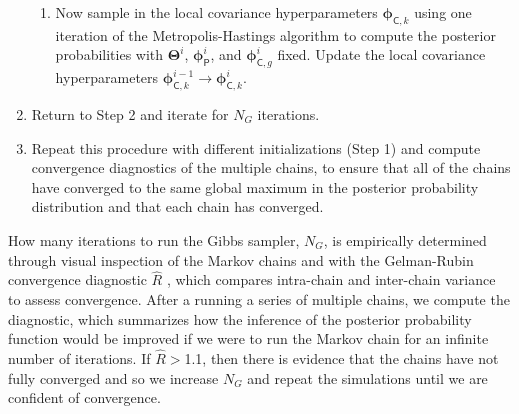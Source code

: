 \documentclass[iop,floatfix]{emulateapj}
\newcommand{\vT}{ {\bm \Theta}}
\newcommand{\vp}{ {\bm \phi}}
\newcommand{\cheb}{ \vp_{\mathsf{P}}}
\begin{document}
\begin{enumerate}
\begin{enumerate}
\item Now sample in the local covariance hyperparameters $\vp_{{\mathsf C},k}$ using one 
iteration of the Metropolis-Hastings algorithm to compute the posterior probabilities
with $\vT^i$, $\cheb^i$, and $\vp_{{\mathsf C}, g}^i$ fixed.  Update the local covariance 
hyperparameters $\vp_{{\mathsf C}, k}^{i-1} \rightarrow \vp_{{\mathsf C}, k}^i$.  
\end{enumerate}

\item Return to Step 2 and iterate for $N_G$ iterations.

\item Repeat this procedure with different initializations (Step 1) and compute convergence diagnostics of the multiple chains, to ensure that all of the chains have converged to the same global 
maximum in the posterior probability distribution and that each chain has converged.
\end{enumerate}
How many iterations to run the Gibbs sampler, $N_G$, is empirically determined through visual inspection of the Markov chains and with the Gelman-Rubin convergence diagnostic $\hat{R}$ \citep[Eqn 11.4]{gelman13}, which compares intra-chain and inter-chain variance to assess convergence. After a running a series of multiple chains, we compute the diagnostic, which summarizes how the inference of the posterior probability function would be improved if we were to run the Markov chain for an infinite number of iterations. If $\hat{R}$$>$1.1, then there is evidence that the chains have not fully converged and so we increase $N_G$ and repeat the simulations until we are confident of convergence.
\end{document}
